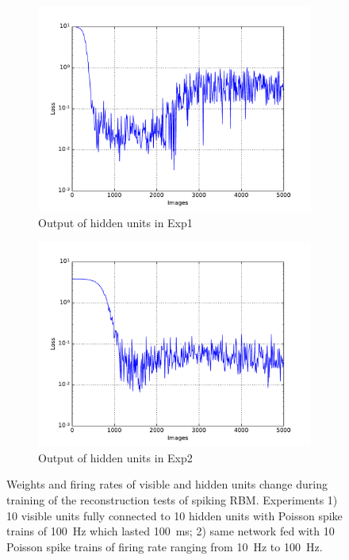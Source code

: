 \begin{figure}
\begin{subfigure}[t]{0.4\textwidth}
		\includegraphics[width=\textwidth]{pics_sdlm/10_exp_SRBM_Orig/exp1_mse_nons.pdf}
		\caption{Output of hidden units in Exp1}
	\end{subfigure}
	\begin{subfigure}[t]{0.4\textwidth}
		\includegraphics[width=\textwidth]{pics_sdlm/10_exp_SRBM_Orig/exp2_mse_nons.pdf}
		\caption{Output of hidden units in Exp2}
	\end{subfigure}
	\caption{Weights and firing rates of visible and hidden units change during training of the reconstruction tests of spiking RBM. 
		Experiments 1) 10 visible units fully connected to 10 hidden units with Poisson spike trains of 100~Hz which lasted 100~ms; 2) same network fed with 10 Poisson spike trains of firing rate ranging from 10~Hz to 100~Hz.}
\end{figure}

